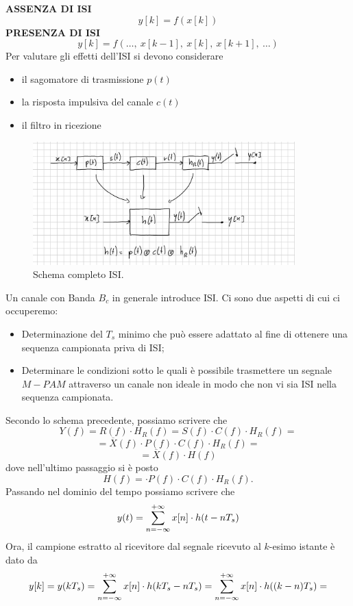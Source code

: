 \documentclass[12pt,oneside,openany]{memoir}
\numberwithin{equation}{subsection}
\begin{document}
\noindent
\textbf{ASSENZA DI ISI}
\[
    y[k] = f(x[k])
\]
\noindent
\textbf{PRESENZA DI ISI}
\[
    y[k] = f(\dots,\  x[k - 1],\  x[k],\  x[k + 1],\  \dots)
\]
\bigbreak
Per valutare gli effetti dell'ISI si devono considerare
\begin{itemize}
    \item il sagomatore di trasmissione $p(t)$
    \item la risposta impulsiva del canale $c(t)$
    \item il filtro in ricezione
\end{itemize}
\begin{figure}[H]
    \centering
    \captionsetup{justification=centering}
    \includegraphics[width=0.9\textwidth]{images/full_isi_scheme.jpg}
    \caption{Schema completo ISI.}
\end{figure}
Un canale con Banda $B_c$ in generale introduce ISI. Ci sono due aspetti di cui
ci occuperemo:
\begin{itemize}
    \item Determinazione del $T_s$ minimo che pu\`o essere adattato al fine di
        ottenere una sequenza campionata priva di ISI;
    \item Determinare le condizioni sotto le quali \`e possibile trasmettere un
        segnale $M-PAM$  attraverso un canale non ideale in modo che non vi sia
        ISI nella sequenza campionata.
\end{itemize}
Secondo lo schema precedente, possiamo scrivere che
\[
    Y(f) = R(f) \cdot H_R(f) = S(f) \cdot C(f) \cdot H_R(f) =
\]
\[
    = \overline{X}(f) \cdot P(f) \cdot C(f) \cdot H_R(f) =
\]
\[
    = \overline{X}(f) \cdot H(f)
\]
dove nell'ultimo passaggio si \`e posto
\[
    H(f) = \cdot P(f) \cdot C(f) \cdot H_R(f).
\]
Passando nel dominio del tempo possiamo scrivere che
\[
    y(t) = \sum\displaylimits_{n = -\infty}^{+\infty} x[n] \cdot h(t - nT_s)
\]
Ora, il campione estratto al ricevitore dal segnale ricevuto al $k$-esimo
istante \`e dato da
\[
    y[k] = y(k T_s) = \sum\displaylimits_{n = -\infty}^{+\infty} x[n] \cdot
    h(kT_s - nT_s) = \sum\displaylimits_{n = -\infty}^{+\infty} x[n] \cdot
    h((k - n) T_s) =
\]
\end{document}
